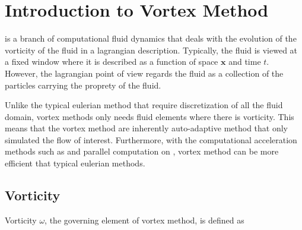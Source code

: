 


\section{Introduction to Vortex Method}
 is a branch of computational fluid dynamics that deals with the evolution of the vorticity of the fluid in a lagrangian description. Typically, the fluid is viewed at a fixed window where it is described as a function of space $\mathbf{x}$ and time $t$. However, the lagrangian point of view regards the fluid as a collection of the particles carrying the proprety of the fluid. 


Unlike the typical eulerian method that require discretization of all the fluid domain, vortex methods only needs fluid elements where there is vorticity. This means that the vortex method are inherently auto-adaptive method that only simulated the flow of interest. Furthermore, with the computational acceleration methods such as  and parallel computation on , vortex method can be more efficient that typical eulerian methods.

\subsection{Vorticity}
Vorticity $\omega$, the governing element of vortex method, is defined as

